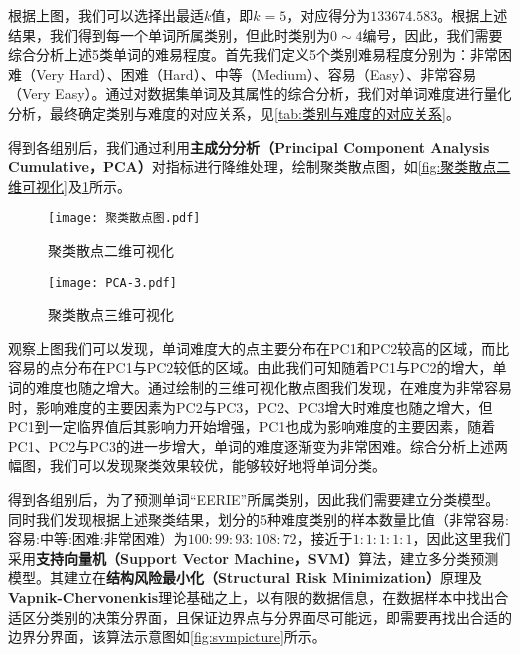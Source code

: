 \documentclass{MathModeling}
\begin{document}
	根据上图，我们可以选择出最适$k$值，即$k=5$，对应得分为$133674.583$。根据上述结果，我们得到每一个单词所属类别，但此时类别为$0\sim4$编号，因此，我们需要综合分析上述5类单词的难易程度。首先我们定义5个类别难易程度分别为：非常困难（Very Hard）、困难（Hard）、中等（Medium）、容易（Easy）、非常容易（Very Easy）。通过对数据集单词及其属性的综合分析，我们对单词难度进行量化分析，最终确定类别与难度的对应关系，见\textcolor{blue}{\cref{tab:类别与难度的对应关系}}。

\begin{table}[H]
	\centering
	\caption{类别与难度的对应关系}
	\label{tab:类别与难度的对应关系}
\end{table}

	得到各组别后，我们通过利用\textbf{主成分分析（Principal Component Analysis Cumulative，PCA）}对指标进行降维处理，绘制聚类散点图，如\textcolor{blue}{\cref{fig:聚类散点二维可视化}}及\textcolor{blue}{\cref{fig:聚类散点三维可视化}}所示。
	
	\begin{figure}[H]
		\centering
		\begin{minipage}{0.48\linewidth}
			\centering
			\texttt{[image: 聚类散点图.pdf]}
			\caption{聚类散点二维可视化}
			\label{fig:聚类散点二维可视化}
		\end{minipage}
		\begin{minipage}{0.48\linewidth}
			\centering
			\texttt{[image: PCA-3.pdf]}
			\caption{聚类散点三维可视化}
			\label{fig:聚类散点三维可视化}
		\end{minipage}
	\end{figure}
	观察上图我们可以发现，单词难度大的点主要分布在PC1和PC2较高的区域，而比容易的点分布在PC1与PC2较低的区域。由此我们可知随着PC1与PC2的增大，单词的难度也随之增大。通过绘制的三维可视化散点图我们发现，在难度为非常容易时，影响难度的主要因素为PC2与PC3，PC2、PC3增大时难度也随之增大，但PC1到一定临界值后其影响力开始增强，PC1也成为影响难度的主要因素，随着PC1、PC2与PC3的进一步增大，单词的难度逐渐变为非常困难。综合分析上述两幅图，我们可以发现聚类效果较优，能够较好地将单词分类。

	得到各组别后，为了预测单词“EERIE”所属类别，因此我们需要建立分类模型。同时我们发现根据上述聚类结果，划分的5种难度类别的样本数量比值（非常容易:容易:中等:困难:非常困难）为$100:99:93:108:72$，接近于$1:1:1:1:1$，因此这里我们采用\textbf{支持向量机（Support Vector Machine，SVM）}算法，建立多分类预测模型。其建立在\textbf{结构风险最小化（Structural Risk Minimization）}原理及\textbf{Vapnik-Chervonenkis}理论基础之上\textcolor{blue}{\cite{psvm}}，以有限的数据信息，在数据样本中找出合适区分类别的决策分界面，且保证边界点与分界面尽可能远，即需要再找出合适的边界分界面，该算法示意图如\textcolor{blue}{\cref{fig:svmpicture}}所示。
\end{document}
